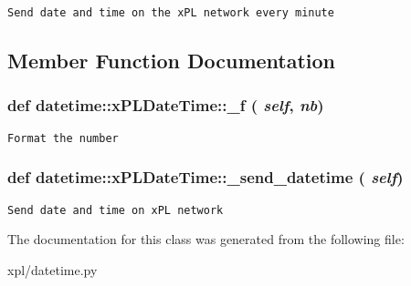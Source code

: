 \footnotesize\begin{verbatim}
Send date and time on the xPL network every minute
\end{verbatim}
\normalsize
 

\subsection{Member Function Documentation}
\hypertarget{classdatetime_1_1xPLDateTime_56f581af02f2f66b6b8d21fe910b9b5d}{
\subsubsection[\_\-f]{\setlength{\rightskip}{0pt plus 5cm}def datetime::xPLDateTime::\_\-f ( {\em self}, \/   {\em nb})}}
\label{classdatetime_1_1xPLDateTime_56f581af02f2f66b6b8d21fe910b9b5d}




\footnotesize\begin{verbatim}
Format the number
\end{verbatim}
\normalsize
 \hypertarget{classdatetime_1_1xPLDateTime_8705cd0ed46a76dda2d82c1a87fc1b3e}{
\subsubsection[\_\-send\_\-datetime]{\setlength{\rightskip}{0pt plus 5cm}def datetime::xPLDateTime::\_\-send\_\-datetime ( {\em self})}}
\label{classdatetime_1_1xPLDateTime_8705cd0ed46a76dda2d82c1a87fc1b3e}




\footnotesize\begin{verbatim}
Send date and time on xPL network
\end{verbatim}
\normalsize
 

The documentation for this class was generated from the following file:\begin{CompactItemize}
\item 
xpl/datetime.py\end{CompactItemize}
